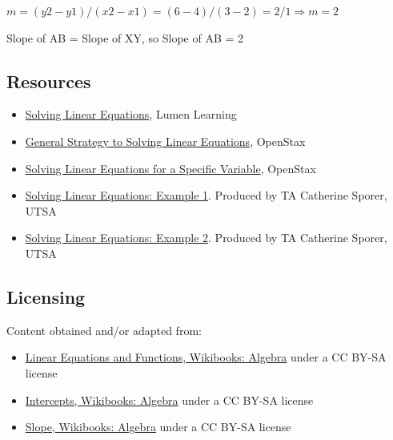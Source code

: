 $m = (y2 - y1)/(x2-x1) = (6-4)/(3-2) = 2/1 \Rightarrow m = 2$



Slope of AB = Slope of XY, so Slope of AB = 2




\subsection{Resources}
\label{sss:reso-55b5}




\begin{itemize}
    \item \href{https://courses.lumenlearning.com/beginalgebra/chapter/introduction-to-solving-linear-equations/}{Solving Linear Equations}, Lumen Learning
    \item \href{https://openstax.org/books/intermediate-algebra-2e/pages/2-1-use-a-general-strategy-to-solve-linear-equations}{General Strategy to Solving Linear Equations}, OpenStax
    \item \href{https://openstax.org/books/intermediate-algebra-2e/pages/2-3-solve-a-formula-for-a-specific-variable}{Solving Linear Equations for a Specific Variable}, OpenStax
    \item \href{https://www.youtube.com/watch?v=bsGyJ0GeRy8}{Solving Linear Equations: Example 1}. Produced by TA Catherine Sporer, UTSA
    \item \href{https://www.youtube.com/watch?v=nGZcfHQEdqo}{Solving Linear Equations: Example 2}. Produced by TA Catherine Sporer, UTSA
\end{itemize}


\subsection{Licensing}
\label{sss:lice-73525}




Content obtained and/or adapted from:



\begin{itemize}
    \item \href{https://en.wikibooks.org/wiki/Algebra/Linear_Equations_and_Functions}{Linear Equations and Functions, Wikibooks: Algebra} under a CC BY-SA license
    \item \href{https://en.wikibooks.org/wiki/Algebra/Intercepts}{Intercepts, Wikibooks: Algebra} under a CC BY-SA license
    \item \href{https://en.wikibooks.org/wiki/Algebra/Slope}{Slope, Wikibooks: Algebra} under a CC BY-SA license
\end{itemize}


